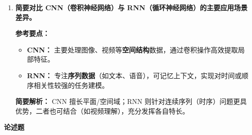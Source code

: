\begin{enumerate}
  \textbf{简要解析：}
  虽然深度学习在诸多领域成绩斐然，但在数据、算力和可解释性上仍存在瓶颈，学术和工业界正致力于研发模型压缩、可解释性方法等技术。

  \item \textbf{简要对比 CNN（卷积神经网络）与 RNN（循环神经网络）的主要应用场景差异。}

  \textbf{参考要点：}
  \begin{itemize}
    \item \textbf{CNN：} 主要处理图像、视频等\textbf{空间结构}数据，通过卷积操作高效提取局部特征。
    \item \textbf{RNN：} 专注\textbf{序列数据}（如文本、语音），可记忆上下文，实现对时间或顺序相关性较强的任务建模。
  \end{itemize}

  \textbf{简要解析：}
  CNN 擅长平面/空间域；RNN 则针对连续序列（时序）问题更具优势，二者也可结合（如视频理解），充分发挥各自特长。

\end{enumerate}

\textbf{论述题}

